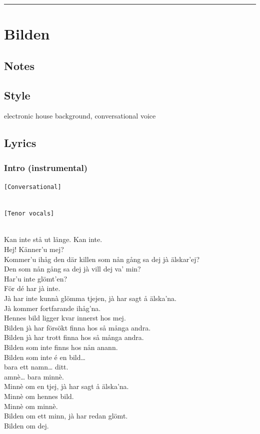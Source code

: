 \begin{center}\rule{0.5\linewidth}{0.5pt}\end{center}

\section{Bilden}\label{bilden}

\subsection{Notes}\label{notes-26}

\subsection{Style}\label{style-25}

electronic house background, conversational voice

\subsection{Lyrics}\label{lyrics-25}

\subsubsection{Intro (instrumental)}\label{intro-instrumental}

\texttt{{[}Conversational{]}}\strut \\
\texttt{{[}Tenor\ vocals{]}}\strut \\
Kan inte stå ut länge. Kan inte.\\
Hej! Känner'u mej?\\
Kommer'u ihåg den där killen som nån gång sa dej jà älskar'ej?\\
Den som nån gång sa dej jà vill dej va' min?\\
Har'u inte glömt'en?\\
För dé har jà inte.\\
Jà har inte kunnà glömma tjejen, jà har sagt å älska'na.\\
Jà kommer fortfarande ihåg'na.\\
Hennes bild ligger kvar innerst hos mej.\\
Bilden jà har försökt finna hos så många andra.\\
Bilden jà har trott finna hos så många andra.\\
Bilden som inte finns hos nån anann.\\
Bilden som inte é en bild\ldots{}\\
bara ett namn\ldots{} ditt.\\
amnè\ldots{} bara minnè.\\
Minnè om en tjej, jà har sagt å älska'na.\\
Minnè om hennes bild.\\
Minnè om minnè.\\
Bilden om ett minn, jà har redan glömt.\\
Bilden om dej.

